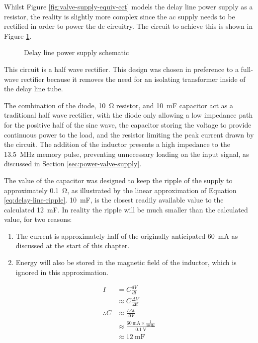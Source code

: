 Whilst Figure \ref{fig:valve-supply-equiv-cct} models the delay line power supply as a resistor, the reality is slightly more complex since the \gls{ac} supply needs to be rectified in order to power the \gls{dc} circuitry. The circuit to achieve this is shown in Figure \ref{fig:delay-line-psu-sch}.

\begin{figure}[ht]
	\centering
	\caption{Delay line power supply schematic }
	\label{fig:delay-line-psu-sch}
\end{figure}

This circuit is a half wave rectifier. This design was chosen in preference to a full-wave rectifier because it removes the need for an isolating transformer inside of the delay line tube.

The combination of the diode, \SI{10}{\ohm} resistor, and \SI{10}{\milli\farad} capacitor act as a traditional half wave rectifier, with the diode only allowing a low impedance path for the positive half of the sine wave, the capacitor storing the voltage to provide continuous power to the load, and the resistor limiting the peak current drawn by the circuit. The addition of the inductor presents a high impedance to the \SI{13.5}{\mega\hertz} memory pulse, preventing unnecessary loading on the input signal, as discussed in Section \ref{sec:power-valve-supply}.

The value of the capacitor was designed to keep the ripple of the supply to approximately \SI{0.1}{\ohm}, as illustrated by the linear approximation of Equation \ref{eq:delay-line-ripple}. \SI{10}{\milli\farad}, is the closest readily available value to the calculated \SI{12}{\milli\farad}. In reality the ripple will be much smaller than the calculated value, for two reasons:

\begin{enumerate}
	\item The current is approximately half of the originally anticipated \SI{60}{\milli\ampere} as discussed at the start of this chapter.
	\item Energy will also be stored in the magnetic field of the inductor, which is ignored in this approximation.
\end{enumerate}

\begin{align}
	I &= C \frac{dV}{dt} \nonumber \\
	&\approx C \frac{\Delta V}{ \Delta t} \nonumber \\
	\therefore C &\approx \frac{I \Delta t}{\Delta V} \nonumber \\
	&\approx \frac{\SI{60}{\milli\ampere} \times \frac{1}{\SI{50}{\hertz}} }{\SI{0.1}{\volt}} \nonumber \\
	&\approx \SI{12}{\milli\farad} \label{eq:delay-line-ripple}
\end{align}


